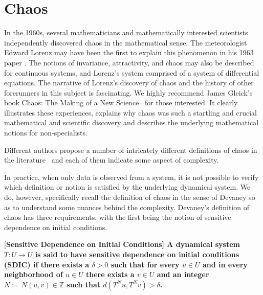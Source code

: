 
\section{Chaos}

In the 1960s, several mathematicians and mathematically interested scientists independently discovered chaos in the mathematical sense. The meteorologist Edward Lorenz may have been the first to explain this phenomenon in his 1963 paper \cite{lorenz1963deterministic}. The notions of invariance, attractivity, and chaos may also be described for continuous systems, and Lorenz's system comprised of a system of differential equations. 
The narrative of Lorenz's discovery of chaos and the history of other forerunners in this subject is fascinating. We highly recommend James Gleick's book Chaos: The Making of a New Science~\cite{gleick2008chaos} for those interested. It clearly illustrates these experiences, explains why chaos was such a startling and crucial mathematical and scientific discovery and describes the underlying mathematical notions for non-specialists.

Different authors propose a number of intricately different definitions of chaos in the literature~\cite{RasbandChaos, TaborChaos, WigginsChaos} and each of them indicate some aspect of complexity.

In practice, when only data is observed from a system, it is not possible to verify which definition or notion is satisfied by the underlying dynamical system. We do, however, specifically recall the definition of chaos in the sense of Devaney \cite{devaney2018introduction,de2013elements} so as to understand some nuances behind the complexity. Devaney's definition of chaos has three requirements, with the first being the notion  of sensitive dependence on initial conditions. 

\begin{Definition}\rm
  [\bf {Sensitive Dependence on Initial Conditions}]\label{Dfn_SDIC}\rm
A dynamical system $T: U \to U$ is said to have sensitive dependence on initial conditions (SDIC) if there exists a $\delta > 0$ such that for every $u \in U$ and in every neighborhood of $u \in U$ there exists a $v\in{U}$ and an integer $N:=N{(u,v)}\in\mathbb{Z}$ such that $d(T^Nu,T^Nv)>\delta$. 	
\end{Definition}

